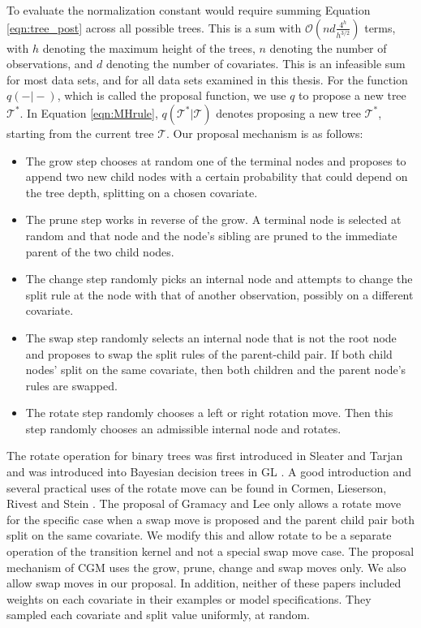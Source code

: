 To evaluate the normalization constant would require summing Equation \ref{eqn:tree_post} across all possible trees. This is a sum with $\mathcal{O}(nd\frac{4^h}{h^{3/2}})$ terms, with $h$ denoting the maximum height of the trees, $n$ denoting the number of observations, and $d$ denoting the number of covariates. This is an infeasible sum for most data sets, and for all data sets examined in this thesis. For the function $q(-\vert-)$, which is called the proposal function, we use $q$ to propose a new tree $\mathcal{T}^*$.   
In Equation \ref{eqn:MHrule}, $q(\mathcal{T}^*\vert\mathcal{T})$ denotes proposing a new tree $\mathcal{T}^*$, starting from the current tree $\mathcal{T}$. 
 Our proposal mechanism is as follows:
  \begin{itemize}
 \item The grow step chooses at random one of the terminal nodes and proposes to append two new child nodes with a certain probability that could depend on the tree depth, splitting on a chosen covariate.
 \item The prune step works in reverse of the grow. A terminal node is selected at random and that node and the node's sibling are pruned to the immediate parent of the two child nodes.
 \item The change step randomly picks an internal node and attempts to change the split rule at the node with that of another observation, possibly on a different covariate.
  \item The swap step randomly selects an internal node that is not the root node and proposes to swap the split rules of the parent-child pair. If both child nodes' split on the same covariate, then both children and the parent node's rules are swapped.
  \item The rotate step randomly chooses a left or right rotation move. Then this step randomly chooses an admissible internal node and rotates.
 \end{itemize}
  The rotate operation for binary trees was first introduced in Sleater and Tarjan \cite{sleator1985self} and was introduced into Bayesian decision trees in GL \cite{gramacy2008bayesian}. A good introduction and several practical uses of the rotate move can be found in Cormen, Lieserson, Rivest and Stein \cite{cormen2001introduction}. The proposal of Gramacy and Lee \cite{gramacy2008bayesian} only allows a rotate move for the specific case when a swap move is proposed and the parent child pair both split on the same covariate. We modify this and allow rotate to be a separate operation of the transition kernel and not a special swap move case. The proposal mechanism of CGM uses the grow, prune, change and swap moves only. We also allow swap moves in our proposal. In addition, neither of these papers included weights on each covariate in their examples or model specifications. They sampled each covariate and split value uniformly, at random. 
  
